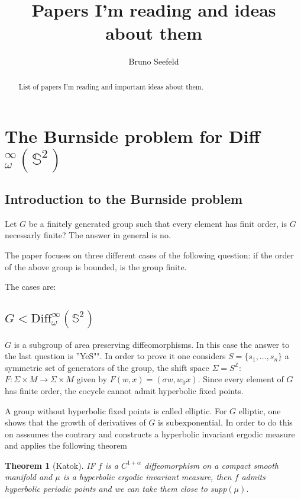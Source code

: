 \documentclass{article}
\title{Papers I'm reading and ideas about them}
\author{Bruno Seefeld}
\newtheorem{theorem}{Theorem}[section]
\begin{document}
\maketitle


\begin{abstract}
List of papers I'm reading and important ideas about them.
\end{abstract}



\section{The Burnside problem for Diff$_\omega^\infty(\mathbb{S}^2)$}


\subsection{Introduction to the Burnside problem}

Let $G$ be a finitely generated group such that every element has finit
order, is $G$ necessarly finite? The answer in general is no.

The paper focuses on three different cases of the following question:
if the order of the above group is bounded, is the group finite.

The cases are:

\subsection{$G<\text{Diff}_\omega^\infty(\mathbb{S}^2)$}

$G$ is a subgroup of area preserving diffeomorphisms. In this
case the answer to the last question is ''YeS"". 
In order to prove it one considers $S=\{s_1,\ldots,s_n\}$ a symmetric
set of generators of the group, the shift space $\Sigma=S^\mathbb{Z}$:
$F:\Sigma\times M \to \Sigma\times M$ given by $F(w,x)=(\sigma w,w_0 x)$.
Since every element of $G$ has finite order, the cocycle cannot admit
hyperbolic fixed points. 

A group without hyperbolic fixed points is called elliptic.
For $G$ elliptic, one shows that the growth of derivatives of $G$ 
is subexponential. In order to do this on asssumes the contrary and
constructs a hyperbolic invariant ergodic measure and applies the 
following theorem

\begin{theorem}[Katok]
    IF $f$ is a $C^{1+\alpha}$ diffeomorphism on a compact smooth manifold and 
    $\mu$ is a hyperbolic ergodic invariant measure, then $f$ admits
    hyperbolic periodic points and we can take them close to supp$(\mu)$.

\end{theorem}
\end{document}

